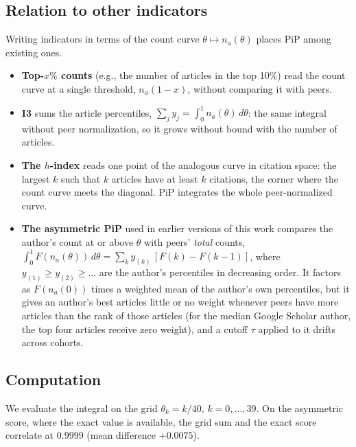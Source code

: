 \subsection*{Relation to other indicators}
Writing indicators in terms of the count curve $\theta \mapsto n_a(\theta)$ places PiP among existing ones.
\begin{itemize}
  \item \textbf{Top-$x\%$ counts} (e.g., the number of articles in the top 10\%) read the count curve at a single
  threshold, $n_a(1-x)$, without comparing it with peers.
  \item \textbf{I3} \cite{leydesdorff2011integrated} sums the article percentiles,
  $\sum_j y_j = \int_0^1 n_a(\theta)\, d\theta$: the same integral without peer normalization, so it grows without bound
  with the number of articles.
  \item \textbf{The $h$-index} reads one point of the analogous curve in citation space: the largest $k$ such that $k$
  articles have at least $k$ citations, the corner where the count curve meets the diagonal. PiP integrates the whole
  peer-normalized curve.
  \item \textbf{The asymmetric PiP} used in earlier versions of this work compares the author's count at or above
  $\theta$ with peers' \emph{total} counts, $\int_0^1 F(n_a(\theta))\, d\theta = \sum_k y_{(k)}\,[F(k)-F(k-1)]$, where
  $y_{(1)} \ge y_{(2)} \ge \dots$ are the author's percentiles in decreasing order. It factors as $F(n_a(0))$ times a
  weighted mean of the author's own percentiles, but it gives an author's best articles little or no weight whenever
  peers have more articles than the rank of those articles (for the median Google Scholar author, the top four articles
  receive zero weight), and a cutoff $\tau$ applied to it drifts across cohorts.
\end{itemize}

\subsection*{Computation}
We evaluate the integral on the grid $\theta_k = k/40$, $k = 0, \dots, 39$. On the asymmetric score, where the exact
value is available, the grid sum and the exact score correlate at $0.9999$ (mean difference $+0.0075$).
